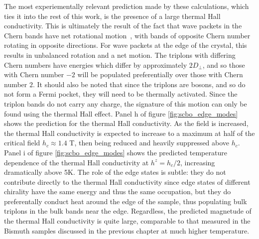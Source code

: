\documentclass{thesis-umich}
\begin{document}
The most experiementally relevant prediction made by these calculations, which ties it into the rest of this work, is the presence of a large thermal Hall conductivity. This is ultimately the result of the fact that wave packets in the Chern bands have net rotational motion~\cite{Xiao2010}, with bands of opposite Chern number rotating in opposite directions. For wave packets at the edge of the crystal, this results in unbalanced rotation and a net motion. The triplons with differing Chern numbers have energies which differ by approximately $2D_\perp$, and so those with Chern number $-2$ will be populated preferentially over those with Chern number $2$. It should also be noted that since the triplons are bosons, and so do not form a Fermi pocket, they will need to be thermally activated. Since the triplon bands do not carry any charge, the signature of this motion can only be found using the thermal Hall effect. Panel h of figure \ref{fig:scbo_edge_modes} shows the prediction for the thermal Hall conductivity. As the field is increased, the thermal Hall conductivity is expected to increase to a maximum at half of the critical field $h_c \approx 1.4$ T, then being reduced and heavily suppressed above $h_c$. Panel i of figure \ref{fig:scbo_edge_modes} shows the predicted temperature dependence of the thermal Hall conductivity at $h^z = h_c/2$, increasing dramatically above 5K. The role of the edge states is subtle: they do not contribute directly to the thermal Hall conductivity since edge states of different chirality have the same energy and thus the same occupation, but they do preferentally conduct heat around the edge of the sample, thus populating bulk triplons in the bulk bands near the edge. Regardless, the predicted magnetude of the thermal Hall conductivity is quite large, comparable to that measured in the Bismuth samples discussed in the previous chapter at much higher temperature.
\end{document}
